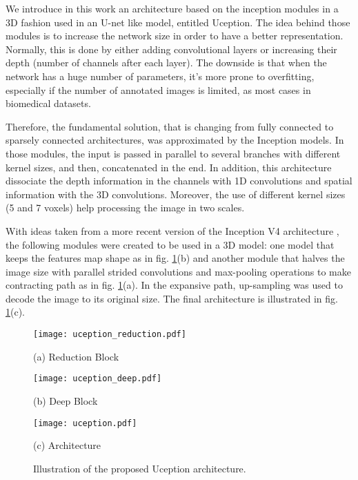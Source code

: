 \documentclass{article}
\begin{document}
We introduce in this work an architecture based on the inception modules \cite{Szegedy2015} in a 3D fashion used in an U-net like model, entitled Uception. The idea behind those modules is to increase the network size in order to have a better representation. Normally, this is done by either adding convolutional layers or increasing their depth (number of channels after each layer). The downside is that when the network has a huge number of parameters, it's more prone to overfitting, especially if the number of annotated images is limited, as most cases in biomedical datasets. 
		
Therefore, the fundamental solution, that is changing from fully connected to sparsely connected architectures, was approximated by the Inception models. In those modules, the input is passed in parallel to several branches with different kernel sizes, and then, concatenated in the end. In addition, this architecture dissociate the depth information in the channels with 1D convolutions and spatial information with the 3D convolutions. Moreover, the use of different kernel sizes (5 and 7 voxels) help processing the image in two scales.
		
With ideas taken from a more recent version of the Inception V4 architecture \cite{Szegedy2016}, the following modules were created to be used in a 3D model: one model that keeps the features map shape as in fig. \ref{fig:uception}(b) and another module that halves the image size with parallel strided convolutions and max-pooling operations to make contracting path as in fig. \ref{fig:uception}(a). In the expansive path, up-sampling was used to decode the image to its original size. The final architecture is illustrated in fig. \ref{fig:uception}(c).

\begin{figure}[htb]

\begin{minipage}[t]{.48\linewidth}
  \texttt{[image: uception\_reduction.pdf]}
  \centerline{(a) Reduction Block}\medskip
\end{minipage}
\begin{minipage}[t]{0.48\linewidth}
  \texttt{[image: uception\_deep.pdf]}
  \centerline{(b) Deep Block}\medskip
\end{minipage}
\begin{minipage}[t]{0.9\linewidth}
\texttt{[image: uception.pdf]}
\centerline{(c) Architecture}\medskip
\end{minipage}
\caption{Illustration of the proposed Uception architecture.}
\label{fig:uception}

\end{figure}
\end{document}
